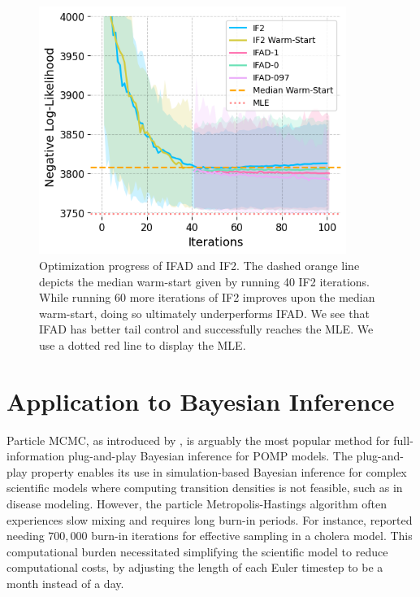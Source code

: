 \documentclass[11pt]{article}
\newcommand\arxiv[2]{#1} %
\begin{document}
\begin{figure}[ht]
    \centering
    \includegraphics[width=\arxiv{10cm}{\textwidth/3}]{../imgs/095/optim.png}
    \caption{Optimization progress of IFAD and IF2. The dashed orange line depicts the median warm-start given by running 40 IF2 iterations. While running 60 more iterations of IF2 improves upon the median warm-start, doing so ultimately underperforms IFAD. We see that IFAD has better tail control and successfully reaches the MLE. 
    We use a dotted red line to display the MLE.}
    \label{fig:optim}
\end{figure}

\section{Application to Bayesian Inference}
\label{sec:bayes}

Particle MCMC, as introduced by \cite{andrieu10}, is arguably the most popular method for full-information plug-and-play Bayesian inference for POMP models.
The plug-and-play property enables its use in simulation-based Bayesian inference for complex scientific models where computing transition densities is not feasible, such as in disease modeling.
However, the particle Metropolis-Hastings algorithm often experiences slow mixing and requires long burn-in periods.
For instance, \cite{fasiolo16} reported needing $700,000$ burn-in iterations for effective sampling in a cholera model.
This computational burden necessitated simplifying the scientific model to reduce computational costs, by adjusting the length of each Euler timestep to be a month instead of a day. 
\end{document}
